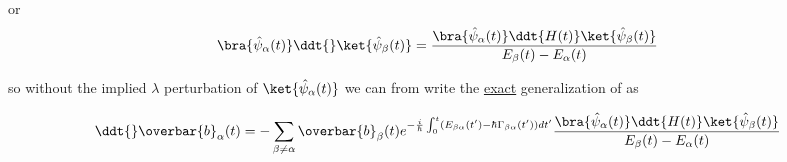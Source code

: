{or
\begin{equation}\label{eqn:qmTwoR3:650}
\bra{\hat{\psi}_\alpha(t)}
\ddt{}\ket{\hat{\psi}_\beta(t)} 
=
\frac{
\bra{\hat{\psi}_\alpha(t)}
\ddt{H(t)} \ket{\hat{\psi}_\beta(t)} 
}
{E_\beta(t) - E_\alpha(t)}
\end{equation}

so without the implied $\lambda$ perturbation of $\ket{\hat{\psi}_\alpha(t)}$ we can from  write the \underline{exact} generalization of  as

\begin{equation}\label{eqn:qmTwoR3:470b}
\ddt{}\overbar{b}_\alpha(t)
=
-\sum_{\beta \ne \alpha} \overbar{b}_\beta(t)
e^{-\frac{i}{\hbar} \int_0^t (E_{\beta\alpha}(t') - \hbar \Gamma_{\beta\alpha}(t')) dt'}
\frac{
\bra{\hat{\psi}_\alpha(t)}
\ddt{H(t)} \ket{\hat{\psi}_\beta(t)} 
}
{E_\beta(t) - E_\alpha(t)}
\end{equation}

}

